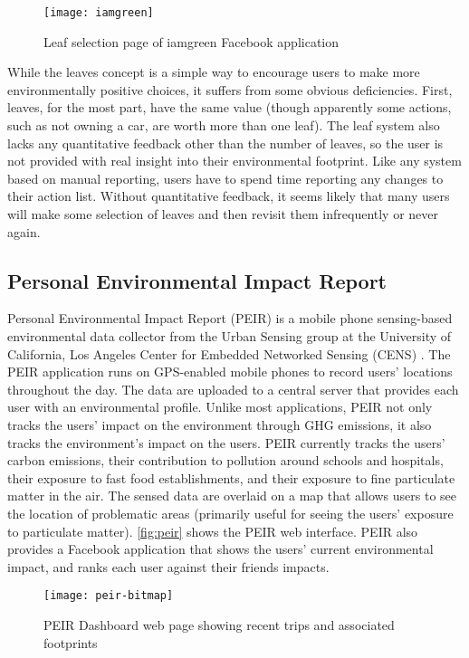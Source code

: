 \begin{figure}[htbp]
	\centering
		\texttt{[image: iamgreen]}
		\caption{Leaf selection page of iamgreen Facebook application}
		\label{fig:iamgreen}
\end{figure}

While the leaves concept is a simple way to encourage users to make more environmentally positive choices, it suffers from some obvious deficiencies. First, leaves, for the most part, have the same value (though apparently some actions, such as not owning a car, are worth more than one leaf). The leaf system also lacks any quantitative feedback other than the number of leaves, so the user is not provided with real insight into their environmental footprint. Like any system based on manual reporting, users have to spend time reporting any changes to their action list. Without quantitative feedback, it seems likely that many users will make some selection of leaves and then revisit them infrequently or never again.

\subsection{Personal Environmental Impact Report}
\label{sec:peir}

Personal Environmental Impact Report (PEIR) is a mobile phone sensing-based environmental data collector from the Urban Sensing group at the University of California, Los Angeles Center for Embedded Networked Sensing (CENS) \cite{peir-website, agapie-2008-seeing-our-signals}. The PEIR application runs on GPS-enabled mobile phones to record users' locations throughout the day. The data are uploaded to a central server that provides each user with an environmental profile. Unlike most applications, PEIR not only tracks the users' impact on the environment through GHG emissions, it also tracks the environment's impact on the users. PEIR currently tracks the users' carbon emissions, their contribution to pollution around schools and hospitals, their exposure to fast food establishments, and their exposure to fine particulate matter in the air. The sensed data are overlaid on a map that allows users to see the location of problematic areas (primarily useful for seeing the users' exposure to particulate matter). \autoref{fig:peir} shows the PEIR web interface. PEIR also provides a Facebook application that shows the users' current environmental impact, and ranks each user against their friends impacts.

\begin{figure}[htbp]
	\centering
		\texttt{[image: peir-bitmap]}
		\caption{PEIR Dashboard web page showing recent trips and associated footprints}
		\label{fig:peir}
\end{figure}

